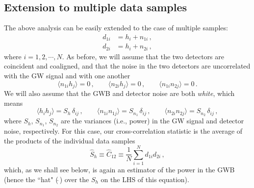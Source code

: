 \documentclass[11pt]{article}
\numberwithin{equation}{section}
\def\be{\begin{equation}}
\def\ee{\end{equation}}
\begin{document}
\subsection{Extension to multiple data samples}
\label{s:multiple_samples}

The above analysis can be easily extended to the case of 
multiple samples:
%
\be
\begin{aligned}
d_{1i} &= h_i + n_{1i}\,,
\\
d_{2i} &= h_i + n_{2i}\,,
\end{aligned}
\ee
%
where $i=1,2,\cdots,N$.
As before, we will assume that the two detectors are
coincident and coaligned, and that the noise in the
two detectors are uncorrelated with the GW signal 
and with one another
%
\be
\langle n_{1i} h_j\rangle = 0\,,
\qquad
\langle n_{2i} h_j\rangle = 0\,,
\qquad
\langle n_{1i}n_{2j}\rangle=0\,.
\ee
%
We will also assume that the GWB 
and detector noise are both {\em white}, which means 
%
\be
\langle h_ih_j\rangle = S_h\,\delta_{ij}\,,
\qquad
\langle n_{1i}n_{1j}\rangle = S_{n_1}\,\delta_{ij}\,,
\qquad
\langle n_{2i}n_{2j}\rangle = S_{n_2}\,\delta_{ij}\,,
\ee
%
where $S_h$, $S_{n_1}$, $S_{n_2}$ are the variances
(i.e., power) in the GW signal and detector noise, respectively.
For this case, our cross-correlation statistic is the
average of the products of the individual data samples
%
\be
\hat S_h 
\equiv \hat C_{12} 
\equiv \frac{1}{N}\sum_{i=1}^N d_{1i} d_{2i}\,,
\ee
%
which, as we shall see below, is again an estimator of the 
power in the GWB (hence the ``hat" ($\hat{\ }$) over the 
$S_h$ on the LHS of this equation).
\end{document}
